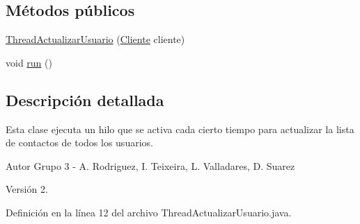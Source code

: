 \subsection*{Métodos públicos}
\begin{DoxyCompactItemize}
\item 
\hyperlink{classcom_1_1ucab_1_1javachat_1_1_cliente_1_1model_1_1_thread_actualizar_usuario_aa62064f454584ef0f01c6c2733b71dbd}{Thread\-Actualizar\-Usuario} (\hyperlink{classcom_1_1ucab_1_1javachat_1_1_cliente_1_1model_1_1_cliente}{Cliente} cliente)
\item 
void \hyperlink{classcom_1_1ucab_1_1javachat_1_1_cliente_1_1model_1_1_thread_actualizar_usuario_ab26592c8af228ec89c8955d4e2324f47}{run} ()
\end{DoxyCompactItemize}


\subsection{Descripción detallada}
Esta clase ejecuta un hilo que se activa cada cierto tiempo para actualizar la lista de contactos de todos los usuarios. \begin{DoxyAuthor}{Autor}
Grupo 3 -\/ A. Rodriguez, I. Teixeira, L. Valladares, D. Suarez 
\end{DoxyAuthor}
\begin{DoxyVersion}{Versión}
2. 
\end{DoxyVersion}


Definición en la línea 12 del archivo Thread\-Actualizar\-Usuario.\-java.



